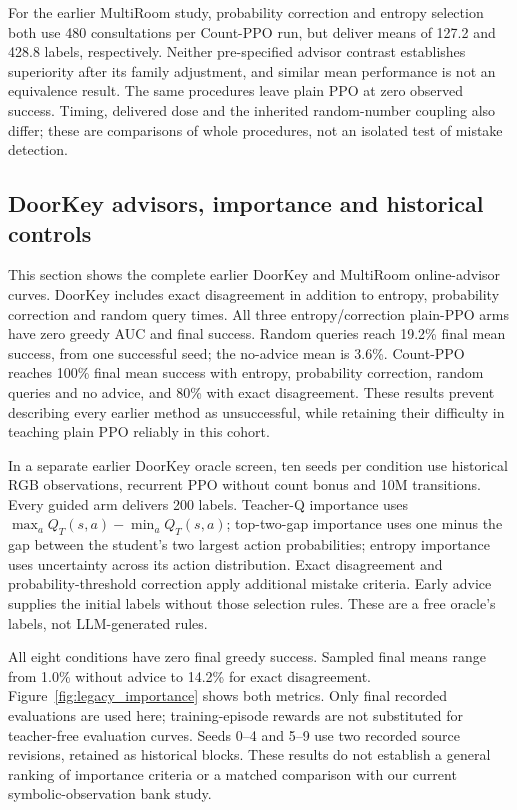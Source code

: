 For the earlier MultiRoom study, probability correction and entropy
selection both use 480 consultations per Count-PPO run, but deliver means
of 127.2 and 428.8 labels, respectively. Neither pre-specified advisor
contrast establishes superiority after its family adjustment, and similar
mean performance is not an equivalence result. The same procedures leave
plain PPO at zero observed success. Timing, delivered dose and the inherited
random-number coupling also differ; these are comparisons of whole
procedures, not an isolated test of mistake detection.






\subsection{DoorKey advisors, importance and historical controls}
This section shows the complete earlier DoorKey and MultiRoom
online-advisor curves. DoorKey includes exact disagreement in addition
to entropy, probability correction and random query times. All three
entropy/correction plain-PPO arms have zero greedy AUC and final success.
Random queries reach 19.2\% final mean success, from one successful seed;
the no-advice mean is 3.6\%. Count-PPO reaches 100\% final mean success
with entropy, probability correction, random queries and no advice, and
80\% with exact disagreement. These results prevent describing every
earlier method as unsuccessful, while retaining their difficulty in
teaching plain PPO reliably in this cohort.

In a separate earlier DoorKey oracle screen, ten seeds per condition use
historical RGB observations, recurrent PPO without count bonus and 10M
transitions. Every guided arm delivers 200 labels. Teacher-Q importance
uses $\max_a Q_T(s,a)-\min_a Q_T(s,a)$; top-two-gap importance uses one
minus the gap between the student's two largest action probabilities;
entropy importance uses uncertainty across its action distribution.
Exact disagreement and probability-threshold correction apply additional
mistake criteria. Early advice supplies the initial labels without those
selection rules. These are a free oracle's labels, not LLM-generated rules.

All eight conditions have zero final greedy success. Sampled final means
range from 1.0\% without advice to 14.2\% for exact disagreement.
Figure~\ref{fig:legacy_importance} shows both metrics. Only final recorded
evaluations are used here; training-episode rewards are not substituted
for teacher-free evaluation curves. Seeds 0--4 and 5--9 use two recorded
source revisions, retained as historical blocks. These results do not
establish a general ranking of importance criteria or a matched
comparison with our current symbolic-observation bank study.

